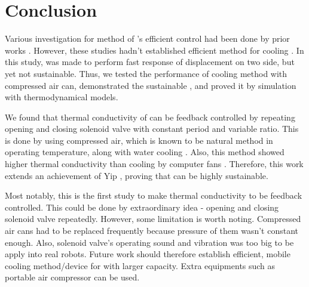 \section{Conclusion}
Various investigation for method of \scpnospace's efficient control had been done by prior works \cite{haines,mirvakili,yip}. %
However, these studies hadn't established efficient method for cooling \scpnospace. %
In this study, \anta was made to perform fast response of displacement on two side, but yet not sustainable. Thus, we tested the performance of cooling method with compressed air can, demonstrated the sustainable \apcnospace, and proved it by simulation with thermodynamical models. %

We found that thermal conductivity of \scp can be feedback controlled by repeating opening and closing solenoid valve with constant period and variable ratio. %
This is done by using compressed air, which is known to be natural method in operating temperature, along with water cooling \cite{madden}.
Also, this method showed higher thermal conductivity than cooling by computer fans \cite{yip}.
Therefore, this work extends an achievement of Yip \etal, proving that \apc can be highly sustainable.

Most notably, this is the first study to make thermal conductivity to be feedback controlled. This could be done by extraordinary idea - opening and closing solenoid valve repeatedly.
However, some limitation is worth noting. 
Compressed air cans had to be replaced frequently because pressure of them wasn't constant enough. 
Also, solenoid valve's operating sound and vibration was too big to be apply into real robots.
Future work should therefore establish efficient, mobile cooling method/device for \scp with larger capacity. 
Extra equipments such as portable air compressor can be used.



